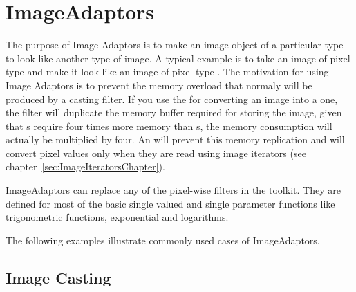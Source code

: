
\chapter{ImageAdaptors}
\label{sec:ImageAdaptors}


The purpose of Image Adaptors is to make an image object of a particular type
to look like another type of image. A typical example is to take an image of
pixel type  and make it look like an image of pixel type
. The motivation for using Image Adaptors is to prevent the memory
overload that normaly will be produced by a casting filter. If you use the
 for converting an  image into a
 one, the filter will duplicate the memory buffer required for
storing the image, given that s require four times more memory than
s, the memory consumption will actually be multiplied by
four. An  will prevent this memory replication and will
convert pixel values only when they are read using image iterators (see
chapter~\ref{sec:ImageIteratorsChapter}).

ImageAdaptors can replace any of the pixel-wise filters in the toolkit. They
are defined for most of the basic single valued and single parameter functions
like trigonometric functions, exponential and logarithms.

The following examples illustrate commonly used cases of ImageAdaptors.

\section{Image Casting}
\label{sec:ImageAdaptorForBasicCasting}
\ifitkFullVersion

\fi


